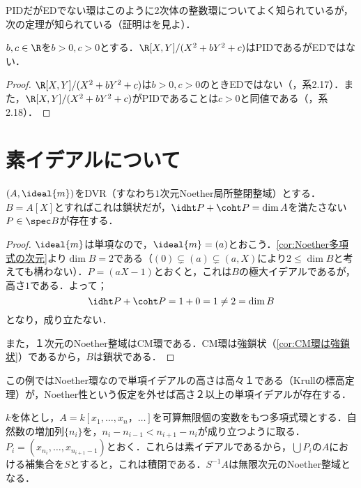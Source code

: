 PIDだがEDでない環はこのように2次体の整数環についてよく知られているが，次の定理が知られている（証明は\cite{goel2018nullstellenstze}を見よ）．

\begin{thm}
	$b,c\in\R$を$b>0,c>0$とする．$\R[X,Y]/(X^2+bY^2+c)$はPIDであるがEDではない．
\end{thm}

\begin{proof}
	$\R[X,Y]/(X^2+bY^2+c)$は$b>0,c>0$のときEDではない（\cite{goel2018nullstellenstze}，系2.17）．また，$\R[X,Y]/(X^2+bY^2+c)$がPIDであることは$c>0$と同値である（\cite{goel2018nullstellenstze}，系2.18）．
\end{proof}

\section{素イデアルについて}
\begin{surex}[鎖状だが$\idht P+\coht P=\dim A$が成りたたない例]\label{ex:鎖状だがht P+coht P<dim P}
	$(A,\ideal{m})$をDVR（すなわち$1$次元Noether局所整閉整域）とする．$B=A[X]$とすればこれは鎖状だが，$\idht P+\coht P=\dim A$を満たさない$P\in\spec B$が存在する．
\end{surex}

\begin{proof}
	$\ideal{m}$は単項なので，$\ideal{m}=(a)$とおこう．\ref{cor:Noether多項式の次元}より$\dim B=2$である（$(0)\subsetneq (a)\subsetneq (a,X)$により$2\leq\dim B$と考えても構わない）．$P=(aX-1)$とおくと，これは$B$の極大イデアルであるが，高さ$1$である．よって；
	\[\idht P+\coht P=1+0=1\neq 2=\dim B\]
	となり，成り立たない．
	
	また，１次元のNoether整域はCM環である．CM環は強鎖状（\ref{cor:CM環は強鎖状}）であるから，$B$は鎖状である．
\end{proof}

この例ではNoether環なので単項イデアルの高さは高々１である（Krullの標高定理）が，Noether性という仮定を外せば高さ２以上の単項イデアルが存在する．
\begin{surex}\label{ex:無限次元Noether環}
	$k$を体とし，$A=k[x_1,\dots,x_n，\dots]$を可算無限個の変数をもつ多項式環とする．自然数の増加列$\{n_i\}$を，$n_i-n_{i-1}<n_{i+1}-n_i$が成り立つように取る．$P_i=(x_{n_i},\dots,x_{n_{i+1}-1})$とおく．これらは素イデアルであるから，$\bigcup P_i$の$A$における補集合を$S$とすると，これは積閉である．$S^{-1}A$は無限次元のNoether整域となる．
\end{surex}

